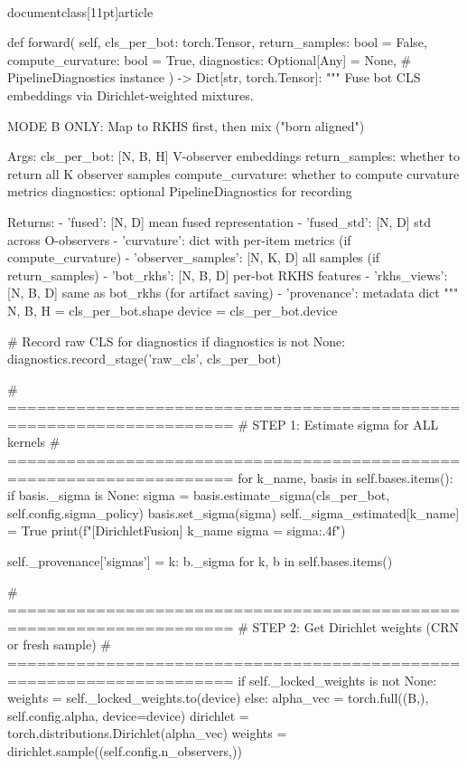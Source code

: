 \\documentclass[11pt]{article}
\begin{document}
\begin{CodeBlock}
    def forward(
        self,
        cls_per_bot: torch.Tensor,
        return_samples: bool = False,
        compute_curvature: bool = True,
        diagnostics: Optional[Any] = None,  # PipelineDiagnostics instance
    ) -> Dict[str, torch.Tensor]:
        """
        Fuse bot CLS embeddings via Dirichlet-weighted mixtures.
        
        MODE B ONLY: Map to RKHS first, then mix ("born aligned")
        
        Args:
            cls_per_bot: [N, B, H] V-observer embeddings
            return_samples: whether to return all K observer samples
            compute_curvature: whether to compute curvature metrics
            diagnostics: optional PipelineDiagnostics for recording
            
        Returns:
            - 'fused': [N, D] mean fused representation
            - 'fused_std': [N, D] std across O-observers
            - 'curvature': dict with per-item metrics (if compute_curvature)
            - 'observer_samples': [N, K, D] all samples (if return_samples)
            - 'bot_rkhs': [N, B, D] per-bot RKHS features
            - 'rkhs_views': [N, B, D] same as bot_rkhs (for artifact saving)
            - 'provenance': metadata dict
        """
        N, B, H = cls_per_bot.shape
        device = cls_per_bot.device
        
        # Record raw CLS for diagnostics
        if diagnostics is not None:
            diagnostics.record_stage('raw_cls', cls_per_bot)
        
        # =====================================================================
        # STEP 1: Estimate sigma for ALL kernels
        # =====================================================================
        for k_name, basis in self.bases.items():
            if basis._sigma is None:
                sigma = basis.estimate_sigma(cls_per_bot, self.config.sigma_policy)
                basis.set_sigma(sigma)
                self._sigma_estimated[k_name] = True
                print(f"[DirichletFusion] {k_name} sigma = {sigma:.4f}")
        
        self._provenance['sigmas'] = {k: b._sigma for k, b in self.bases.items()}
        
        # =====================================================================
        # STEP 2: Get Dirichlet weights (CRN or fresh sample)
        # =====================================================================
        if self._locked_weights is not None:
            weights = self._locked_weights.to(device)
        else:
            alpha_vec = torch.full((B,), self.config.alpha, device=device)
            dirichlet = torch.distributions.Dirichlet(alpha_vec)
            weights = dirichlet.sample((self.config.n_observers,))
        

\end{CodeBlock}
\end{document}

